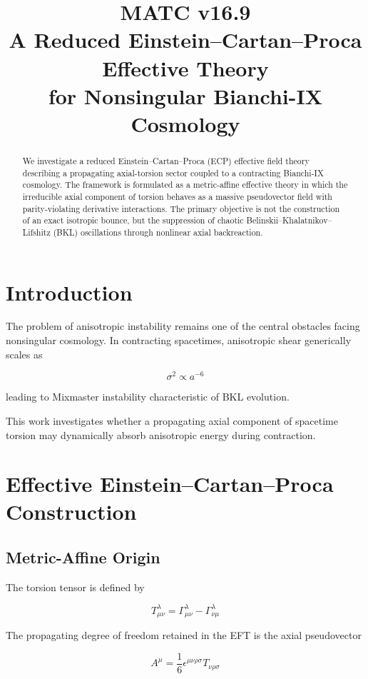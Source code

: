 \documentclass[11pt]{article}
\title{MATC v16.9\\
A Reduced Einstein--Cartan--Proca Effective Theory\\
for Nonsingular Bianchi-IX Cosmology}
\author{}
\date{}
\begin{document}
\maketitle

\begin{abstract}
We investigate a reduced Einstein--Cartan--Proca (ECP) effective field theory describing a propagating axial-torsion sector coupled to a contracting Bianchi-IX cosmology. The framework is formulated as a metric-affine effective theory in which the irreducible axial component of torsion behaves as a massive pseudovector field with parity-violating derivative interactions. The primary objective is not the construction of an exact isotropic bounce, but the suppression of chaotic Belinskii--Khalatnikov--Lifshitz (BKL) oscillations through nonlinear axial backreaction.
\end{abstract}

\section{Introduction}

The problem of anisotropic instability remains one of the central obstacles facing nonsingular cosmology. In contracting spacetimes, anisotropic shear generically scales as

\[
\sigma^2 \propto a^{-6}
\]

leading to Mixmaster instability characteristic of BKL evolution.

This work investigates whether a propagating axial component of spacetime torsion may dynamically absorb anisotropic energy during contraction.

\section{Effective Einstein--Cartan--Proca Construction}

\subsection{Metric-Affine Origin}

The torsion tensor is defined by

\[
T^\lambda_{\mu\nu}
=
\Gamma^\lambda_{\mu\nu}
-
\Gamma^\lambda_{\nu\mu}
\]

The propagating degree of freedom retained in the EFT is the axial pseudovector

\[
A^\mu
=
\frac{1}{6}
\epsilon^{\mu\nu\rho\sigma}
T_{\nu\rho\sigma}
\]
\end{document}
